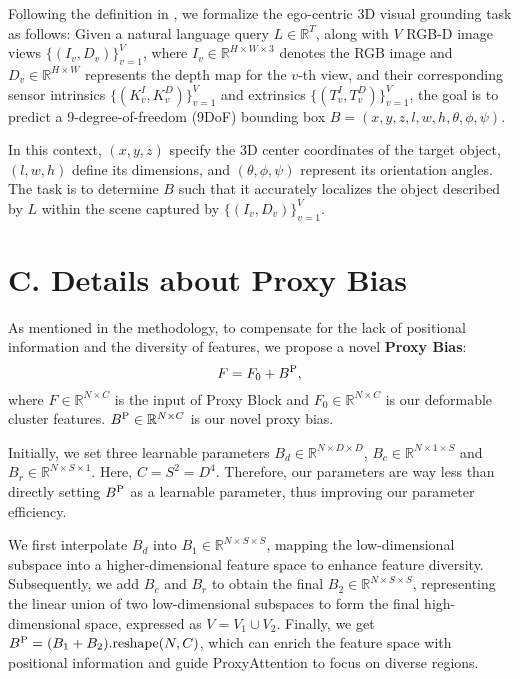 Following the definition in \cite{wang2023embodiedscan}, we formalize the ego-centric 3D visual grounding task as follows: Given a natural language query \(L \in \mathbb{R}^T\), along with \(V\) RGB-D image views \(\{(I_v, D_v)\}_{v=1}^V\), where \(I_v \in \mathbb{R}^{H \times W \times 3}\) denotes the RGB image and \(D_v \in \mathbb{R}^{H \times W}\) represents the depth map for the \(v\)-th view, and their corresponding sensor intrinsics \(\{(K^I_v, K^D_v)\}_{v=1}^V\) and extrinsics \(\{(T^I_v, T^D_v)\}_{v=1}^V\), the goal is to predict a 9-degree-of-freedom (9DoF) bounding box \(B = (x, y, z, l, w, h, \theta, \phi, \psi)\). 

In this context, \((x, y, z)\) specify the 3D center coordinates of the target object, \((l, w, h)\) define its dimensions, and \((\theta, \phi, \psi)\) represent its orientation angles. The task is to determine \(B\) such that it accurately localizes the object described by \(L\) within the scene captured by \(\{(I_v, D_v)\}_{v=1}^V\).


\section*{C. Details about Proxy Bias}
As mentioned in the methodology, to compensate for the lack of positional information and the diversity of features, we propose a novel \textbf{Proxy Bias}:
\begin{equation}
    F = F_0 + B^{\rm P},
\end{equation}
where $F \in \mathbb{R}^{N \times C}$ is the input of Proxy Block and $F_0 \in \mathbb{R}^{N \times C}$ is our deformable cluster features. $B^{\rm P} \in \mathbb{R}^{N \times C}$ is our novel proxy bias.

Initially, we set three learnable parameters $B_d \in \mathbb{R}^{N \times D \times D}$, $B_c \in \mathbb{R}^{N \times 1 \times S}$ and $B_r \in \mathbb{R}^{N \times S \times 1}$. Here, $C = S^2 = D^4$. Therefore, our parameters are way less than directly setting $B^{\rm P}$ as a learnable parameter, thus improving our parameter efficiency.

We first interpolate \( B_d \) into \( B_1 \in \mathbb{R}^{N \times S \times S} \), mapping the low-dimensional subspace into a higher-dimensional feature space to enhance feature diversity. Subsequently, we add \( B_c \) and \( B_r \) to obtain the final \( B_2 \in \mathbb{R}^{N \times S \times S} \), representing the linear union of two low-dimensional subspaces to form the final high-dimensional space, expressed as \( V = V_1 \cup V_2 \). Finally, we get $B^{\rm P} = (B_1 + B_2).{\rm reshape}(N,C)$, which can enrich the feature space with positional information and guide ProxyAttention to focus on diverse regions.

